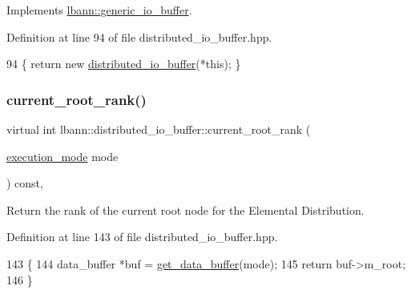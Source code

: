 Implements \hyperlink{classlbann_1_1generic__io__buffer_a9d8020b82cf467c9148b0b37e7229262}{lbann\+::generic\+\_\+io\+\_\+buffer}.



Definition at line 94 of file distributed\+\_\+io\+\_\+buffer.\+hpp.


\begin{DoxyCode}
94 \{ \textcolor{keywordflow}{return} \textcolor{keyword}{new} \hyperlink{classlbann_1_1distributed__io__buffer_a2066033e844ec7b9b95dfe7615a0a256}{distributed\_io\_buffer}(*\textcolor{keyword}{this}); \}
\end{DoxyCode}
\mbox{\label{classlbann_1_1distributed__io__buffer_a9d7cd67615c71ec7a94533c29796e4ab}} 
\subsubsection{\texorpdfstring{current\+\_\+root\+\_\+rank()}{current\_root\_rank()}}
{\footnotesize\ttfamily virtual int lbann\+::distributed\+\_\+io\+\_\+buffer\+::current\+\_\+root\+\_\+rank (\begin{DoxyParamCaption}\item[{\hyperlink{base_8hpp_a2781a159088df64ed7d47cc91c4dc0a8}{execution\+\_\+mode}}]{mode }\end{DoxyParamCaption}) const\hspace{0.3cm}{\ttfamily [inline]}, {\ttfamily [virtual]}}



Return the rank of the current root node for the Elemental Distribution. 



Definition at line 143 of file distributed\+\_\+io\+\_\+buffer.\+hpp.


\begin{DoxyCode}
143                                                            \{
144     data\_buffer *buf = \hyperlink{classlbann_1_1distributed__io__buffer_ac176f3fced1191534a985f831136aa3e}{get\_data\_buffer}(mode);
145     \textcolor{keywordflow}{return} buf->m\_root;
146   \}
\end{DoxyCode}
\mbox{\label{classlbann_1_1distributed__io__buffer_a3a770ec2314313761d6f0eccdb9dc09b}} 
